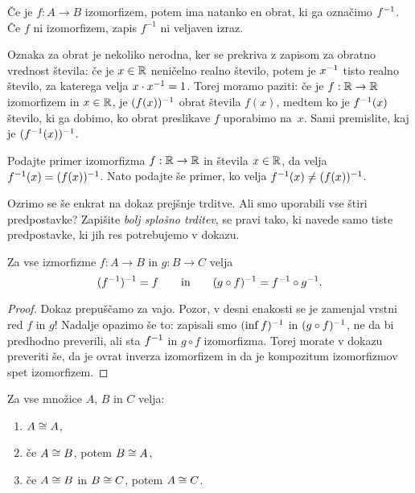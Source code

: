 Če je $f : A \to B$ izomorfizem, potem ima natanko en obrat, ki ga označimo $f^{-1}$. Če
$f$ ni izomorfizem, zapis $f^{-1}$ ni veljaven izraz.

Oznaka za obrat je nekoliko nerodna, ker se prekriva z zapisom za obratno vrednost
števila: če je $x \in \mathbb{R}$ neničelno realno število, potem je $x^{-1}$ tisto realno
število, za katerega velja $x \cdot x^{-1} = 1$. Torej moramo paziti: če je
$f : \mathbb{R} \to \mathbb{R}$ izomorfizem in $x \in \mathbb{R}$, je $(f(x))^{-1}$ obrat števila $f(x)$,
medtem ko je $f^{-1}(x)$ število, ki ga dobimo, ko obrat preslikave $f$ uporabimo na~$x$.
Sami premislite, kaj je $(f^{-1}(x))^{-1}$.

\begin{vaja}
  Podajte primer izomorfizma $f : \mathbb{R} \to \mathbb{R}$ in števila $x \in \mathbb{R}$, da velja
  $f^{-1}(x) = (f(x))^{-1}$. Nato podajte še primer, ko velja
  $f^{-1}(x) \neq (f(x))^{-1}$.
\end{vaja}

\begin{vaja}
  Ozrimo se še enkrat na dokaz prejšnje trditve. Ali smo uporabili vse štiri predpostavke?
  Zapišite \emph{bolj splošno trditev}, se pravi tako, ki navede samo tiste predpostavke,
  ki jih res potrebujemo v dokazu.
\end{vaja}

\begin{trditev}
  Za vse izmorfizme $f : A \to B$ in $g : B \to C$ velja
  \begin{equation*}
    (f^{-1})^{-1} = f
    \qquad\text{in}\qquad
    (g \circ f)^{-1} = f^{-1} \circ g^{-1}.
  \end{equation*}
\end{trditev}

\begin{proof}
  Dokaz prepuščamo za vajo. Pozor, v desni enakosti se je zamenjal vrstni red $f$ in $g$!
  Nadalje opazimo še to: zapisali smo $(\inf{f})^{-1}$ in $(g \circ f)^{-1}$, ne da bi
  predhodno preverili, ali sta $f^{-1}$ in $g \circ f$ izomorfizma. Torej morate v dokazu
  preveriti še, da je ovrat inverza izomorfizem in da je kompozitum izomorfizmov spet
  izomorfizem.
\end{proof}

\begin{trditev}
  Za vse množice $A$, $B$ in $C$ velja:
  \begin{enumerate}
  \item $A \cong A$,
  \item če $A \cong B$, potem $B \cong A$,
  \item če $A \cong B$ in $B \cong C$, potem $A \cong C$.
  \end{enumerate}
\end{trditev}

